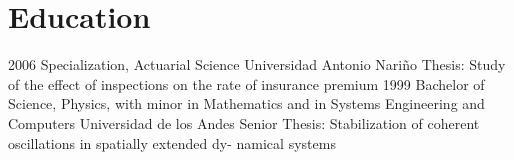 \section{Education}
\begin{entrylist}
  \entry
	{2006}
	{Specialization, Actuarial Science}
	{Universidad Antonio Nariño}
	{Thesis: Study of the effect of inspections on the rate of insurance premium}
  \entry
	{1999}
	{Bachelor of Science, Physics, with minor in Mathematics and in Systems Engineering and Computers}
	{Universidad de los Andes}
	{Senior Thesis: Stabilization of coherent oscillations in spatially extended dy-
	namical systems}
\end{entrylist}

